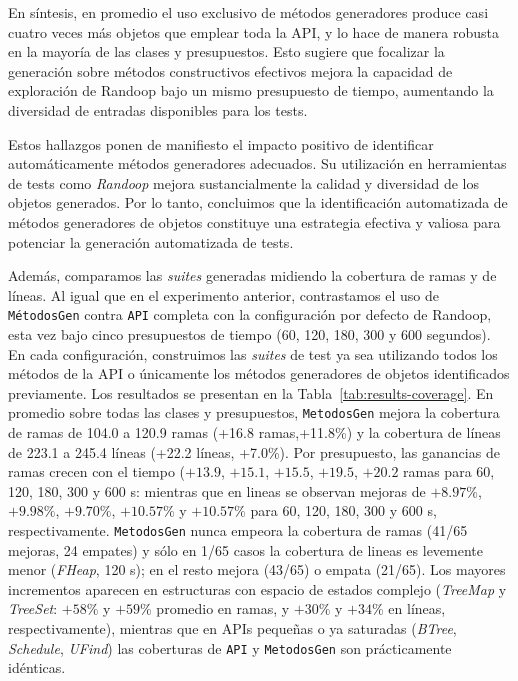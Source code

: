 En síntesis, en promedio el uso exclusivo de métodos generadores
produce casi cuatro veces más objetos que emplear toda la API, y lo
hace de manera robusta en la mayoría de las clases y presupuestos. Esto sugiere
que focalizar la generación sobre métodos constructivos efectivos mejora la
capacidad de exploración de Randoop bajo un mismo presupuesto de tiempo,
aumentando la diversidad de entradas disponibles para los tests.

Estos hallazgos ponen de manifiesto el impacto positivo de identificar automáticamente métodos 
generadores adecuados. Su utilización en herramientas de tests como \emph{Randoop} mejora sustancialmente 
la calidad y diversidad de los objetos generados. Por lo tanto, concluimos que la identificación automatizada de métodos generadores de objetos 
constituye una estrategia efectiva y valiosa para potenciar la generación automatizada de tests.



Además, comparamos las \emph{suites} generadas midiendo la cobertura de ramas y de líneas. 
Al igual que en el experimento anterior, contrastamos el uso de \texttt{MétodosGen} contra 
\texttt{API} completa con la configuración por defecto de Randoop, 
esta vez bajo cinco presupuestos de tiempo (60, 120, 180, 300 y 600 segundos). 
En cada configuración, construimos las \emph{suites} de test ya sea utilizando 
todos los métodos de la API o únicamente los métodos generadores de objetos 
identificados previamente. Los resultados se presentan en la Tabla~\ref{tab:results-coverage}.
En promedio sobre todas las clases y presupuestos, \texttt{MetodosGen} mejora la
cobertura de ramas de 104.0 a 120.9 ramas
(+16.8 ramas,+11.8\%) y la cobertura de líneas de
223.1 a 245.4 líneas (+22.2 líneas, +7.0\%).
Por presupuesto, las ganancias de ramas crecen con el tiempo
(\(+13{.}9\), \(+15{.}1\), \(+15{.}5\), \(+19{.}5\), \(+20{.}2\) ramas para
60, 120, 180, 300 y 600 s: mientras que
en lineas se observan mejoras de \(+8{.}97\%\), \(+9{.}98\%\), \(+9{.}70\%\), \(+10{.}57\%\) y \(+10{.}57\%\) para 60, 120, 180, 300 y 600 s, respectivamente.
\texttt{MetodosGen} nunca empeora la cobertura de ramas (41/65 mejoras, 24 empates)
y sólo en 1/65 casos la cobertura de lineas es levemente menor
(\emph{FHeap}, 120 s); en el resto mejora (43/65) o empata (21/65).
Los mayores incrementos aparecen en estructuras con espacio de estados complejo
(\emph{TreeMap} y \emph{TreeSet}: \(+58\%\) y \(+59\%\) promedio en ramas,
y \(+30\%\) y \(+34\%\) en líneas, respectivamente), mientras que en APIs pequeñas o ya
saturadas (\emph{BTree}, \emph{Schedule}, \emph{UFind}) las coberturas de
\texttt{API} y \texttt{MetodosGen} son prácticamente idénticas.

